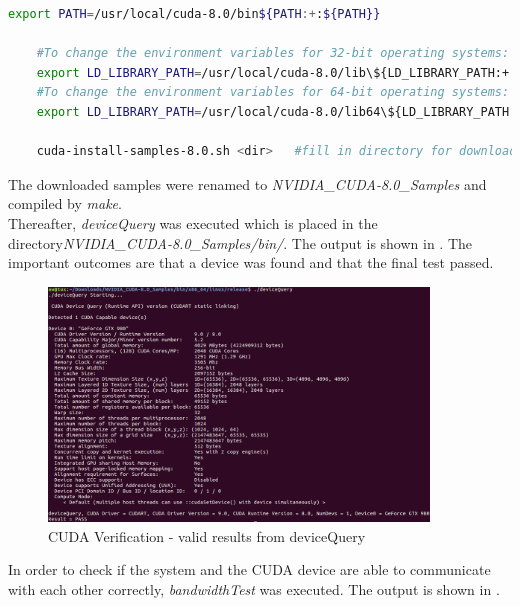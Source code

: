 \begin{minipage}{\linewidth}
\begin{lstlisting}[caption=Setup CUDA verification environment, label=list:cudaVerifyEnv, language=bash]
	export PATH=/usr/local/cuda-8.0/bin${PATH:+:${PATH}}
	
	#To change the environment variables for 32-bit operating systems:
	export LD_LIBRARY_PATH=/usr/local/cuda-8.0/lib\${LD_LIBRARY_PATH:+:${LD_LIBRARY_PATH}}
	#To change the environment variables for 64-bit operating systems:
	export LD_LIBRARY_PATH=/usr/local/cuda-8.0/lib64\${LD_LIBRARY_PATH:+:${LD_LIBRARY_PATH}}
	
	cuda-install-samples-8.0.sh <dir>	#fill in directory for downloaded samples
\end{lstlisting}
\end{minipage}

The downloaded samples were renamed to \textit{NVIDIA_CUDA-8.0_Samples} and compiled by \textit{make}. \\

Thereafter, \textit{deviceQuery} was executed which is placed in the directory\textit{NVIDIA_CUDA-8.0_Samples/bin/}. The output is shown in . The important outcomes are that a device was found and that the final test passed. \\

\begin{figure}[htbp]
\centering
\includegraphics[width=0.9\textwidth]{includes/GPUdeviceQuery}
\caption[CUDA Verification - valid results from deviceQuery]{CUDA Verification - valid results from deviceQuery}
\label{fig:GPUdeviceQuery}
\end{figure}

In order to check if the system and the CUDA device are able to communicate with each other correctly, \textit{bandwidthTest} was executed. The output is shown in . \\

